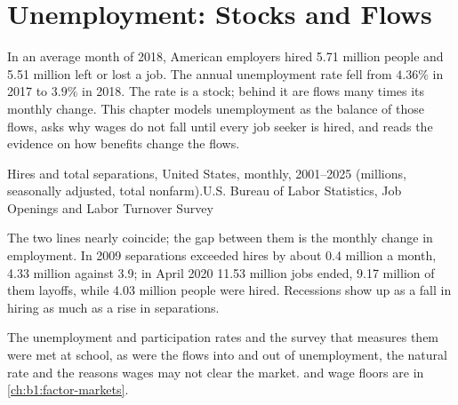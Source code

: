 \chapter{Unemployment: Stocks and Flows}\label{ch:b1:unemployment-flows}

In an average month of 2018, American employers hired 5.71 million people
and 5.51 million left or lost a job. %
The annual unemployment rate fell from $4.36\%$ in 2017 to $3.9\%$ in 2018.
The rate is a stock; behind it are flows many times its monthly change.
This chapter models unemployment as the balance of those flows, asks why
wages do not fall until every job seeker is hired, and reads the evidence
on how benefits change the flows.

\begin{openingchart}{Hires and total separations, United States, monthly,
2001--2025 (millions, seasonally adjusted, total nonfarm).}{U.S. Bureau of Labor
Statistics, Job Openings and Labor Turnover Survey}
\end{openingchart}

The two lines nearly coincide; the gap between them is the monthly change
in employment. In 2009 separations exceeded hires by about 0.4 million a
month, 4.33 million against 3.9; in April 2020 11.53 million jobs ended,
9.17 million of them layoffs, while 4.03 million people were hired.
Recessions show up as a fall in hiring as much as a rise in separations.

\begin{recall}
The unemployment and participation rates and the survey that measures
them were met at school, as were the flows into and out of unemployment,
the natural rate and the reasons wages may not clear the market. 
and wage floors are in \cref{ch:b1:factor-markets}.
\end{recall}


